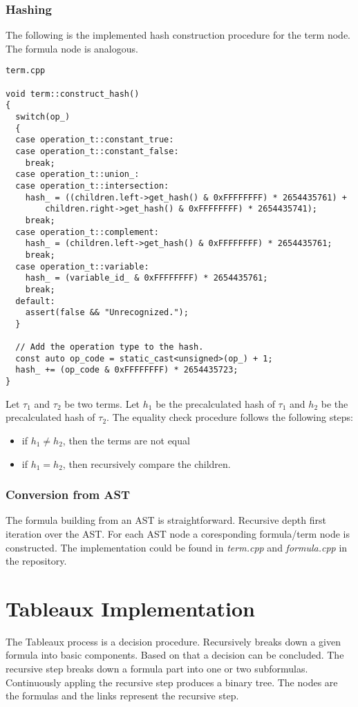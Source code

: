 \documentclass{article}
\begin{document}
	\subsubsection{Hashing}
	The following is the implemented hash construction procedure for the term node. The formula node is analogous.

\begin{lstlisting}
term.cpp

void term::construct_hash()
{
  switch(op_)
  {
  case operation_t::constant_true:
  case operation_t::constant_false:
    break;
  case operation_t::union_:
  case operation_t::intersection:
    hash_ = ((children.left->get_hash() & 0xFFFFFFFF) * 2654435761) +
        children.right->get_hash() & 0xFFFFFFFF) * 2654435741);
    break;
  case operation_t::complement:
    hash_ = (children.left->get_hash() & 0xFFFFFFFF) * 2654435761;
    break;
  case operation_t::variable:
    hash_ = (variable_id_ & 0xFFFFFFFF) * 2654435761;
    break;
  default:
    assert(false && "Unrecognized.");
  }

  // Add the operation type to the hash.
  const auto op_code = static_cast<unsigned>(op_) + 1;
  hash_ += (op_code & 0xFFFFFFFF) * 2654435723;
}
\end{lstlisting}

	Let $\tau_1$ and $\tau_2$ be two terms. Let $h_1$ be the precalculated hash of $\tau_1$ and $h_2$ be the precalculated hash of $\tau_2$.
	The equality check procedure follows the following steps:
	\begin{itemize}
		\item if $h_1 \neq h_2$, then the terms are not equal
		\item if $h_1 = h_2$, then recursively compare the children.
	\end{itemize}
	\noindent

	\newpage
	\subsubsection{Conversion from AST}
	The formula building from an AST is straightforward. Recursive depth first iteration over the AST. For each AST node a coresponding formula/term node is constructed. The implementation could be found in \textit{term.cpp} and \textit{formula.cpp} in the repository.

	\newpage
	\section{Tableaux Implementation}
	The Tableaux process is a decision procedure. Recursively breaks down a given formula into basic components. Based on that a decision can be concluded. The recursive step breaks down a formula part into one or two subformulas. Continuously appling the recursive step produces a binary tree. The nodes are the formulas and the links represent the recursive step.
\end{document}
